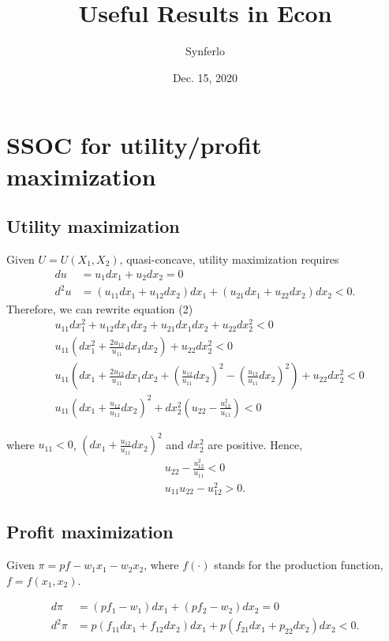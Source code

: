 \documentclass[12pt]{article}
\title{Useful Results in Econ}
\author{Synferlo}
\date{Dec. 15, 2020}
\begin{document}
\maketitle
\newpage


\section{SSOC for utility/profit maximization}

\subsection{Utility maximization}

Given $ U = U(X_1, X_2) $, quasi-concave, utility maximization requires
\begin{align}
				du  &= u_1dx_1 + u_2dx_2 = 0\\
				d^{2}u  &= (u_{11}dx_1 + u_{12}dx_2)dx_1 + (u_{21}dx_1 + u_{22}dx_2)dx_2
				< 0.
\end{align}
Therefore, we can rewrite equation (2)
\begin{align}
				&u_{11}dx_1^{2} + u_{12}dx_1dx_2 + u_{21}dx_1dx_2 + u_{22}dx_2^{2}  <0\\
				&u_{11}(dx_1^{2} + \frac{2u_{12}}{u_{11}}dx_1dx_2) + u_{22}dx_2^{2} <0\\
				&u_{11}\left(dx_1 + \frac{2u_{12}}{u_{11}}dx_1dx_2 + (\frac{u_{12}}{u_{11}}dx_2
				)^{2} - (\frac{u_{12}}{u_{11}}dx_2)^{2}\right) + u_{22}dx_2^{2} <0\\
				&u_{11}(dx_1 + \frac{u_{12}}{u_{11}}dx_2)^{2} + dx_2^{2}
				(u_{22} - \frac{u_{12}^{2}}{u_{11}}) < 0
\end{align}

where $ u_{11} < 0 $, $ (dx_1 + \frac{u_{12}}{u_{11}}dx_2)^{2} $ and $ dx_2^{2} $
are positive. Hence,
\begin{align}
				u_{22} - \frac{u_{12}^{2}}{u_{11}} < 0\\
				u_{11}u_{22} - u_{12}^{2} > 0.
\end{align}



\subsection{Profit maximization}

Given $ \pi = pf - w_1x_1 - w_2x_2 $, where $ f(\cdot ) $ stands for the 
production function, $ f = f(x_1, x_2) $.

\begin{align}
				d \pi  &= (pf_1 - w_1)dx_1 + (pf_2 - w_2)dx_2 =0\\
				d^{2} \pi  &= p(f_{11}dx_1 + f_{12}dx_2)dx_1 + p(f_{21}dx_1 + p_{22}dx_2)
				dx_2 <0.
\end{align}
\end{document}
